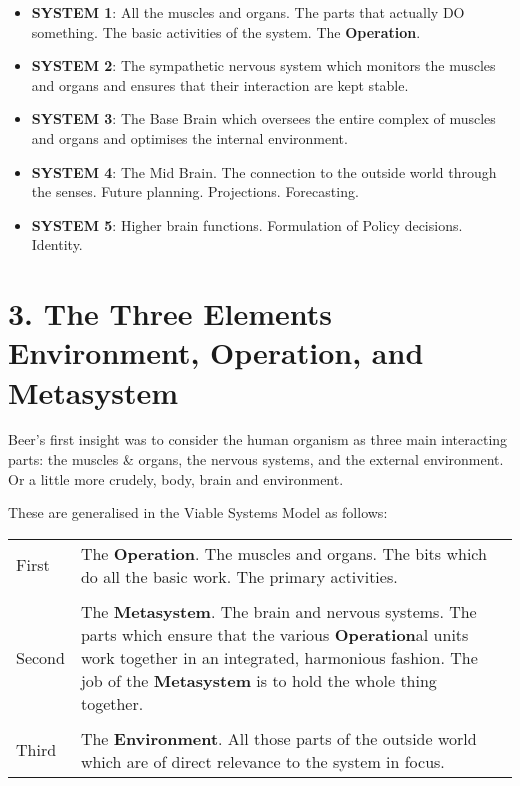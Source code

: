 \begin{itemize}
  \item \textbf{SYSTEM 1}: All the muscles and organs. The parts that actually DO something. The basic activities of the system. The \textcolor{O}{\textbf{Operation}}.

  \item \textbf{SYSTEM 2}: The sympathetic nervous system which monitors the muscles and organs and ensures that their interaction are kept stable.

  \item \textbf{SYSTEM 3}: The Base Brain which oversees the entire complex of muscles and organs and optimises the internal environment.

  \item \textbf{SYSTEM 4}: The Mid Brain. The connection to the outside world through the senses. Future planning. Projections. Forecasting.

  \item \textbf{SYSTEM 5}: Higher brain functions. Formulation of Policy decisions. Identity.

\end{itemize}

\section*{3. The Three Elements \textcolor{E}{Environment}, \textcolor{O}{Operation}, and \textcolor{M}{Metasystem}}
Beer's first insight was to consider the human organism as three main interacting parts: the muscles \& organs, the nervous systems, and the external environment. Or a little more crudely, body, brain and environment.

These are generalised in the Viable Systems Model as follows:

\begin{tabular}{  p{}  p{} }
First	&	The \textcolor{O}{\textbf{Operation}}. The muscles and organs. The bits which do all the basic work. The primary activities.\\
\\
Second	&	The \textcolor{M}{\textbf{Metasystem}}. The brain and nervous systems. The parts which ensure that the various \textcolor{O}{\textbf{Operation}}al units work together in an integrated, harmonious fashion. The job of the \textcolor{M}{\textbf{Metasystem}} is to hold the whole thing together.\\
\\
Third	&	The \textcolor{E}{\textbf{Environment}}. All those parts of the outside world which are of direct relevance to the system in focus.
\end{tabular}


